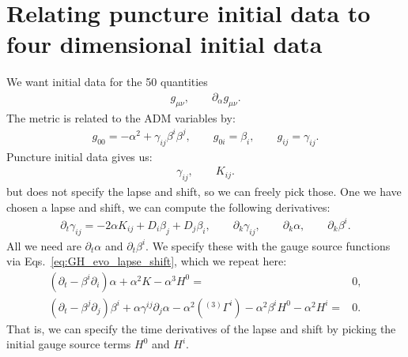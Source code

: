 \documentclass[%
notitlepage,
report,
nofootinbib,
 amsmath,amssymb,
 aps,
]{revtex4-1}
\begin{document}
\section{Relating puncture initial data to four dimensional initial data}
We want initial data for the 50 quantities
\begin{align}
   g_{\mu\nu},\qquad\partial_{\alpha}g_{\mu\nu}
   .
\end{align}
The metric is related to the ADM variables by:
\begin{subequations}
\begin{align}
   g_{00}
   =
   -  
   \alpha^2
   +
   \gamma_{ij}\beta^i\beta^j
   ,\qquad
   g_{0i}
   =
   \beta_i
   ,\qquad
   g_{ij}
   =
   \gamma_{ij}
   .
\end{align}
\end{subequations}
Puncture initial data gives us:
\begin{align}
   \gamma_{ij},\qquad K_{ij}
   .
\end{align}
but does not specify the lapse and shift, so we can freely pick those.
One we have chosen a lapse and shift, we can compute the following derivatives:
\begin{subequations}
\begin{align}
   \partial_t\gamma_{ij}
   =
   -
   2\alpha K_{ij}
   +
   D_i\beta_j
   +
   D_j\beta_i
   ,\qquad
   \partial_k\gamma_{ij}
   ,\qquad
   \partial_k\alpha
   ,\qquad
   \partial_k\beta^i
   .
\end{align}
\end{subequations}
All we need are $\partial_t\alpha$ and $\partial_t\beta^i$.
We specify these with the gauge source functions via
Eqs.~\eqref{eq:GH_evo_lapse_shift}, which we repeat here:
\begin{subequations}
\begin{align}
   \left(
      \partial_t
   -  \beta^i\partial_i
   \right)
   \alpha
   +  \alpha^2K
   -  \alpha^3H^0
   =&
   0
   ,\\
   \left(
      \partial_t
   -  \beta^j\partial_j
   \right)
   \beta^i
+  \alpha\gamma^{ij}\partial_j\alpha
-  \alpha^2\left({}^{(3)}\Gamma^i\right)
-  \alpha^2\beta^iH^0
-  \alpha^2H^i
   =&
   0
   .
\end{align}   
\end{subequations}
That is, we can specify the time derivatives of the lapse and shift
by picking the initial gauge source terms $H^0$ and $H^i$.

\end{document}
